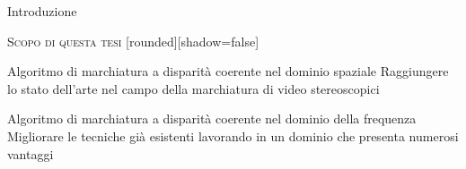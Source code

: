 \documentclass{beamer}
\begin{document}
\begin{section}{Introduzione}
\begin{frame}[t]{\textsc{Scopo di questa tesi}}
	[rounded][shadow=false]
\begin{center}
\begin{block}{Algoritmo di marchiatura a disparit\`{a} coerente nel dominio spaziale}
Raggiungere lo stato dell'arte nel campo della marchiatura di video stereoscopici
\end{block}
\vspace{1em}
\begin{block}{Algoritmo di marchiatura a disparit\`{a} coerente nel dominio della frequenza}
Migliorare le tecniche gi\`{a} esistenti lavorando in un dominio che presenta numerosi vantaggi
\end{block}
\end{center}
\end{frame}




\end{section}
\end{document}
